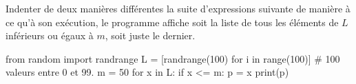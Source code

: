 Indenter de deux manières différentes la suite d'expressions suivante de manière à ce qu'à son exécution, le programme affiche soit la liste de tous les éléments de $L$ inférieurs ou égaux à $m$, soit juste le dernier.
\begin{pyverbatim}
from random import randrange
L = [randrange(100) for i in range(100)] # 100 valeurs entre 0 et 99.
m = 50
for x in L:
if x <= m:
p = x
print(p)
\end{pyverbatim}
